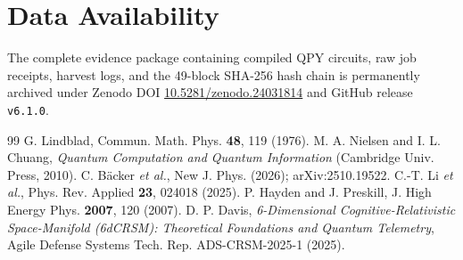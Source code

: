 \documentclass[aps,prxquantum,reprint,superscriptaddress,floatfix]{revtex4-2}
\begin{document}
\section*{Data Availability}
The complete evidence package containing compiled QPY circuits, raw job receipts, harvest logs, and the 49-block SHA-256 hash chain is permanently archived under Zenodo DOI \href{https://doi.org/10.5281/zenodo.24031814}{10.5281/zenodo.24031814} and GitHub release \texttt{v6.1.0}.



\begin{thebibliography}{99}
 G. Lindblad, Commun. Math. Phys. \textbf{48}, 119 (1976).
 M. A. Nielsen and I. L. Chuang, \textit{Quantum Computation and Quantum Information} (Cambridge Univ. Press, 2010).
 C. B\"acker \textit{et al.}, New J. Phys. (2026); arXiv:2510.19522.
 C.-T. Li \textit{et al.}, Phys. Rev. Applied \textbf{23}, 024018 (2025).
 P. Hayden and J. Preskill, J. High Energy Phys. \textbf{2007}, 120 (2007).
 D. P. Davis, \textit{6-Dimensional Cognitive-Relativistic Space-Manifold (6dCRSM): Theoretical Foundations and Quantum Telemetry}, Agile Defense Systems Tech. Rep. ADS-CRSM-2025-1 (2025).
\end{thebibliography}
\end{document}
